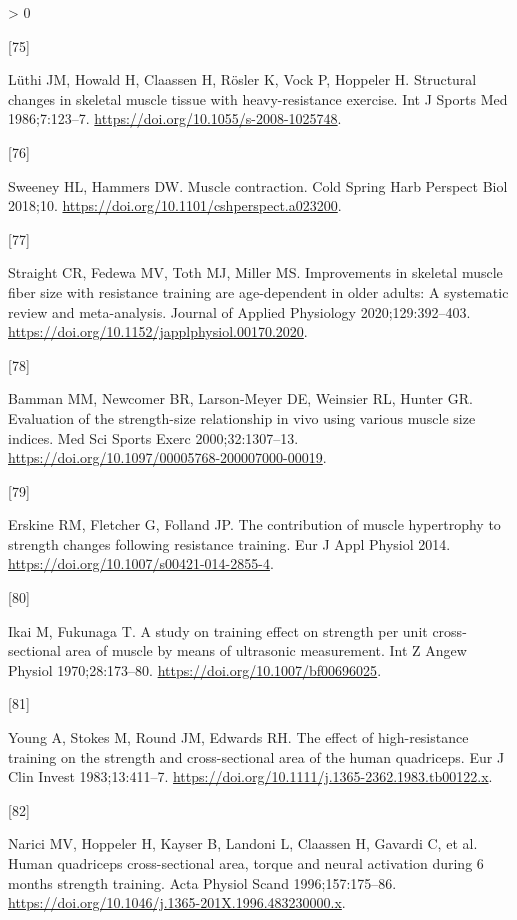 \documentclass[twoside,10pt]{gihclass} %
\newlength{\cslhangindent}
\newlength{\csllabelwidth}
\newenvironment{CSLReferences}[3] %
 {%
  \setlength{\parindent}{0pt}
  \ifodd #1 \everypar{\setlength{\hangindent}{\cslhangindent}}\ignorespaces\fi
  \ifnum #2 > 0
  \setlength{\parskip}{#2\baselineskip}
  \fi
 }%
 {}
\newcommand{\CSLLeftMargin}[1]{\parbox[t]{\maxof{\widthof{#1}}{\csllabelwidth}}{#1}}
\newcommand{\CSLRightInline}[1]{\parbox[t]{\linewidth}{#1}}
\begin{document}
\begin{CSLReferences}{0}{0}
\leavevmode\hypertarget{ref-RN2731}{}%
\CSLLeftMargin{{[}75{]} }
\CSLRightInline{Lüthi JM, Howald H, Claassen H, Rösler K, Vock P, Hoppeler H. Structural changes in skeletal muscle tissue with heavy-resistance exercise. Int J Sports Med 1986;7:123--7. \url{https://doi.org/10.1055/s-2008-1025748}.}

\leavevmode\hypertarget{ref-RN2756}{}%
\CSLLeftMargin{{[}76{]} }
\CSLRightInline{Sweeney HL, Hammers DW. Muscle contraction. Cold Spring Harb Perspect Biol 2018;10. \url{https://doi.org/10.1101/cshperspect.a023200}.}

\leavevmode\hypertarget{ref-RN2669}{}%
\CSLLeftMargin{{[}77{]} }
\CSLRightInline{Straight CR, Fedewa MV, Toth MJ, Miller MS. Improvements in skeletal muscle fiber size with resistance training are age-dependent in older adults: A systematic review and meta-analysis. Journal of Applied Physiology 2020;129:392--403. \url{https://doi.org/10.1152/japplphysiol.00170.2020}.}

\leavevmode\hypertarget{ref-RN2758}{}%
\CSLLeftMargin{{[}78{]} }
\CSLRightInline{Bamman MM, Newcomer BR, Larson-Meyer DE, Weinsier RL, Hunter GR. Evaluation of the strength-size relationship in vivo using various muscle size indices. Med Sci Sports Exerc 2000;32:1307--13. \url{https://doi.org/10.1097/00005768-200007000-00019}.}

\leavevmode\hypertarget{ref-RN1142}{}%
\CSLLeftMargin{{[}79{]} }
\CSLRightInline{Erskine RM, Fletcher G, Folland JP. The contribution of muscle hypertrophy to strength changes following resistance training. Eur J Appl Physiol 2014. \url{https://doi.org/10.1007/s00421-014-2855-4}.}

\leavevmode\hypertarget{ref-RN2629}{}%
\CSLLeftMargin{{[}80{]} }
\CSLRightInline{Ikai M, Fukunaga T. A study on training effect on strength per unit cross-sectional area of muscle by means of ultrasonic measurement. Int Z Angew Physiol 1970;28:173--80. \url{https://doi.org/10.1007/bf00696025}.}

\leavevmode\hypertarget{ref-RN2737}{}%
\CSLLeftMargin{{[}81{]} }
\CSLRightInline{Young A, Stokes M, Round JM, Edwards RH. The effect of high-resistance training on the strength and cross-sectional area of the human quadriceps. Eur J Clin Invest 1983;13:411--7. \url{https://doi.org/10.1111/j.1365-2362.1983.tb00122.x}.}

\leavevmode\hypertarget{ref-RN2735}{}%
\CSLLeftMargin{{[}82{]} }
\CSLRightInline{Narici MV, Hoppeler H, Kayser B, Landoni L, Claassen H, Gavardi C, et al. Human quadriceps cross-sectional area, torque and neural activation during 6 months strength training. Acta Physiol Scand 1996;157:175--86. \url{https://doi.org/10.1046/j.1365-201X.1996.483230000.x}.}


\end{CSLReferences}
\end{document}
